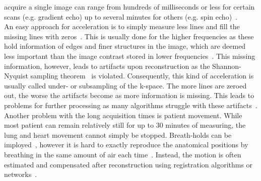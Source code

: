 acquire a single image can range from hundreds of milliseconds or less for certain scans (e.g. gradient echo) up to several minutes for others (e.g. spin echo)~\cite{AdvancesPI}.\\
An easy approach for acceleration is to simply measure less lines and fill the missing lines with zeros~\cite{DeepMRIReconstructionSubsampling}. This is usually done for the higher frequencies as these hold information of edges and finer structures in the image, which are deemed less important than the image contrast stored in lower frequencies~\cite{AdvancesPI}. This missing information, however, leads to artifacts upon reconstruction as the Shannon-Nyquist sampling theorem~\cite{Shannon} is violated. Consequently, this kind of acceleration is usually called under- or subsampling of the k-space. The more lines are zeroed out, the worse the artifacts become as more information is missing. This leads to problems for further processing as many algorithms struggle with these artifacts~\cite{DeepMRIReconstructionSubsampling}. \\
Another problem with the long acquisition times is patient movement. While most patient can remain relatively still for up to 30 minutes of measuring, the lung and heart movement cannot simply be stopped. Breath-holds can be imployed~\cite{Zaitsev2015}, however it is hard to exactly reproduce the anatomical positions by breathing in the same amount of air each time~\cite{Lin2022}. Instead, the motion is often estimated and compensated after reconstruction using registration algorithms or networks~\cite{Kuestner2022,Chen2023,GRICS}.

